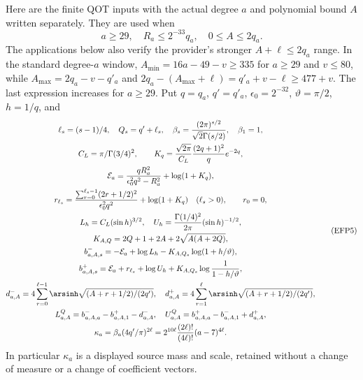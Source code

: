 \documentclass[11pt,a4paper]{article}
\begin{document}
Here are the finite QOT inputs with the actual degree $a$ and polynomial
bound $A$ written separately. They are used when
\[
a\ge29,\quad R_a\le2^{-33}q_a,\quad 0\le A\le2q_a.
\tag{EFP4}\label{efp:qguard}
\]
The applications below also verify the provider's stronger
$A+\ell\le2q_a$ range. In the standard degree-$a$ window,
$A_{\min}=16a-49-v\ge335$ for $a\ge29$ and $v\le80$,
while $A_{\max}=2q_a-v-q'_a$ and
$2q_a-(A_{\max}+\ell)=q'_a+v-\ell\ge477+v$.
The last expression increases for $a\ge29$.
Put $q=q_a$, $q'=q'_a$,
$\epsilon_0=2^{-32}$, $\vartheta=\pi/2$, $h=1/q$, and
\[
\begin{gathered}
\ell_s=(s-1)/4,\quad Q_s=q'+\ell_s,\quad
\beta_s=\frac{(2\pi)^{s/2}}{\sqrt2\Gamma(s/2)},\quad \beta_1=1,\\
C_L=\pi/\Gamma(3/4)^2,\qquad
K_q=\frac{\sqrt{2\pi}}{C_L}\frac{(2q+1)^2}{q}e^{-2q},\\
\mathcal E_a=\frac{qR_a^2}{\epsilon_0^2q^2-R_a^2}+\log(1+K_q),\\
r_{\ell_s}=\frac{\sum_{r=0}^{\ell_s-1}(2r+1/2)^2}{\epsilon_0^2q^2}
 +\log(1+K_q)\quad(\ell_s>0),\qquad r_0=0,\\
L_h=C_L(\sin h)^{3/2},\quad
U_h=\frac{\Gamma(1/4)^2}{2\pi}(\sin h)^{-1/2},\\
K_{A,Q}=2Q+1+2A+2\sqrt{A(A+2Q)},\\
b^-_{a,A,s}=-\mathcal E_a+\log L_h-K_{A,Q_s}\log(1+h/\vartheta),\\
b^+_{a,A,s}=\mathcal E_a+r_{\ell_s}+\log U_h+
                         K_{A,Q_s}\log\frac1{1-h/\vartheta},\\
d^-_{a,A}=4\sum_{r=0}^{\ell-1}\arsinh\sqrt{(A+r+1/2)/(2q')},\quad
d^+_{a,A}=4\sum_{r=1}^{\ell}\arsinh\sqrt{(A+r+1/2)/(2q')},\\
L^Q_{a,A}=b^-_{a,A,a}-b^+_{a,A,1}-d^-_{a,A},\quad
U^Q_{a,A}=b^+_{a,A,a}-b^-_{a,A,1}+d^+_{a,A},\\
\kappa_a=\beta_a(4q'/\pi)^{2\ell}
       =2^{10\ell}\frac{(2\ell)!}{(4\ell)!}(a-7)^{4\ell}.
\end{gathered}\tag{EFP5}\label{efp:qconstants}
\]
In particular $\kappa_a$ is a displayed source mass and scale, retained
without a change of measure or a change of coefficient vectors.
\end{document}
